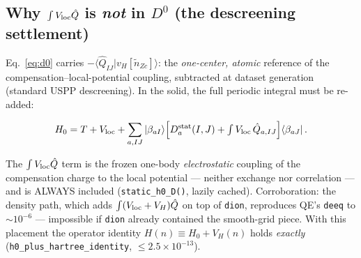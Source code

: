 \documentclass[11pt]{article}
\newcommand{\code}[1]{\texttt{#1}}
\newcommand{\Dstat}{D^{\rm stat}}
\newcommand{\ket}[1]{|#1\rangle}
\newcommand{\bra}[1]{\langle#1|}
\newcommand{\Qhat}{\hat{Q}}
\begin{document}
\subsection{Why $\int V_{\rm loc}\Qhat$ is \emph{not} in $D^0$ (the
descreening settlement)}
\label{sec:vlocq}
Eq.~\eqref{eq:d0} carries $-\langle\Qhat_{IJ}|v_H[\tilde n_{Zc}]\rangle$:
the \emph{one-center, atomic} reference of the compensation--local-potential
coupling, subtracted at dataset generation (standard USPP descreening).
In the solid, the full periodic integral must be re-added:
\begin{keybox}
\begin{equation}
H_0 = T + V_{\rm loc}
+ \sum_{a,IJ}\ket{\beta_{aI}}
\Big[\Dstat_a(I,J) + \textstyle\int V_{\rm loc}\,\Qhat_{a,IJ}\Big]
\bra{\beta_{aJ}}\,.
\label{eq:h0}
\end{equation}
\end{keybox}
The $\int V_{\rm loc}\Qhat$ term is the frozen one-body \emph{electrostatic}
coupling of the compensation charge to the local potential --- neither
exchange nor correlation --- and is ALWAYS included
(\code{static\_h0\_D()}, lazily cached). Corroboration: the density path,
which adds $\int(V_{\rm loc}+V_H)\Qhat$ on top of \code{dion}, reproduces
QE's \code{deeq} to $\sim$$10^{-6}$ --- impossible if \code{dion} already
contained the smooth-grid piece. With this placement the operator identity
$H(n)\equiv H_0 + V_H(n)$ holds \emph{exactly}
(\code{h0\_plus\_hartree\_identity}, $\le 2.5\times10^{-13}$).
\end{document}
